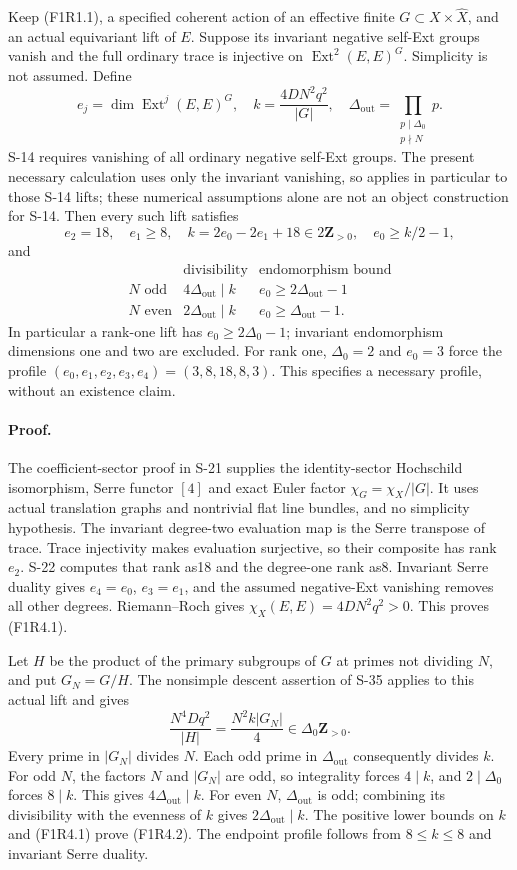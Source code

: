 Keep (F1R1.1), a specified coherent action of an effective finite
$G\subset X\times\widehat X$, and an actual equivariant lift of
$E$. Suppose its invariant negative self-Ext groups vanish and
the full ordinary trace is injective on $\operatorname{Ext}^2(E,E)^G$.
Simplicity is not assumed. Define
\[
 e_j=\dim\operatorname{Ext}^j(E,E)^G,\quad
 k=\frac{4DN^2q^2}{|G|},\quad
 \Delta_{\mathrm{out}}=\prod_{\substack{p\mid\Delta_0\\p\nmid N}}p.
\]
S-14 requires vanishing of all ordinary negative self-Ext
groups. The present necessary calculation uses only the
invariant vanishing, so applies in particular to those S-14
lifts; these numerical assumptions alone are not an object
construction for S-14.
Then every such lift satisfies
\[
 e_2=18,\quad e_1\ge8,\quad
 k=2e_0-2e_1+18\in2\mathbf Z_{>0},\quad e_0\ge k/2-1,
 \tag{F1R4.1}
\]
and
\[
 \begin{array}{c|c|c}
 &\text{divisibility}&\text{endomorphism bound}\\\hline
 N\text{ odd}&4\Delta_{\mathrm{out}}\mid k
             &e_0\ge2\Delta_{\mathrm{out}}-1\\
 N\text{ even}&2\Delta_{\mathrm{out}}\mid k
             &e_0\ge\Delta_{\mathrm{out}}-1.
 \end{array}
 \tag{F1R4.2}
\]
In particular a rank-one lift has $e_0\ge2\Delta_0-1$;
invariant endomorphism dimensions one and two are excluded.
For rank one, $\Delta_0=2$ and $e_0=3$ force the profile
$(e_0,e_1,e_2,e_3,e_4)=(3,8,18,8,3)$.
This specifies a necessary profile, without an existence claim.

\paragraph{Proof.}
The coefficient-sector proof in S-21 supplies the identity-sector
Hochschild isomorphism, Serre functor $[4]$ and exact Euler factor
$\chi_G=\chi_X/|G|$. It uses actual translation graphs and nontrivial
flat line bundles, and no simplicity hypothesis. The invariant
degree-two evaluation map is the Serre transpose of trace. Trace
injectivity makes evaluation surjective, so their composite has
rank $e_2$. S-22 computes that rank as18 and the degree-one rank
as8. Invariant Serre duality gives $e_4=e_0$, $e_3=e_1$, and the
assumed negative-Ext vanishing removes all other degrees.
Riemann--Roch gives $\chi_X(E,E)=4DN^2q^2>0$.
This proves (F1R4.1).

Let $H$ be the product of the primary subgroups of $G$ at primes
not dividing $N$, and put $G_N=G/H$. The nonsimple descent
assertion of S-35 applies to this actual lift and gives
\[
 \frac{N^4Dq^2}{|H|}
       =\frac{N^2k|G_N|}{4}\in\Delta_0\mathbf Z_{>0}.
 \tag{F1R4.3}
\]
Every prime in $|G_N|$ divides $N$. Each odd prime in
$\Delta_{\mathrm{out}}$ consequently divides $k$.
For odd $N$, the factors $N$ and $|G_N|$ are odd, so
integrality forces $4\mid k$, and $2\mid\Delta_0$ forces
$8\mid k$. This gives $4\Delta_{\mathrm{out}}\mid k$.
For even $N$, $\Delta_{\mathrm{out}}$ is odd; combining its
divisibility with the evenness of $k$ gives
$2\Delta_{\mathrm{out}}\mid k$. The positive lower bounds
on $k$ and (F1R4.1) prove (F1R4.2). The endpoint profile follows
from $8\le k\le8$ and invariant Serre duality.

